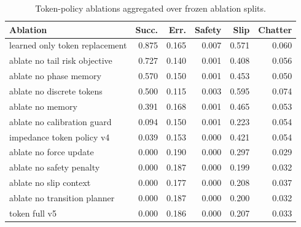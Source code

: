 \begin{table}[t]
\centering
\caption{Token-policy ablations aggregated over frozen ablation splits.}
\label{tab:ablation}
\small
\begin{tabular}{lrrrrr}
\toprule
Ablation & Succ. & Err. & Safety & Slip & Chatter \\
\midrule
learned only token replacement & 0.875 & 0.165 & 0.007 & 0.571 & 0.060 \\
ablate no tail risk objective & 0.727 & 0.140 & 0.001 & 0.408 & 0.056 \\
ablate no phase memory & 0.570 & 0.150 & 0.001 & 0.453 & 0.050 \\
ablate no discrete tokens & 0.500 & 0.115 & 0.003 & 0.595 & 0.074 \\
ablate no memory & 0.391 & 0.168 & 0.001 & 0.465 & 0.053 \\
ablate no calibration guard & 0.094 & 0.150 & 0.001 & 0.223 & 0.054 \\
impedance token policy v4 & 0.039 & 0.153 & 0.000 & 0.421 & 0.054 \\
ablate no force update & 0.000 & 0.190 & 0.000 & 0.297 & 0.029 \\
ablate no safety penalty & 0.000 & 0.187 & 0.000 & 0.199 & 0.032 \\
ablate no slip context & 0.000 & 0.177 & 0.000 & 0.208 & 0.037 \\
ablate no transition planner & 0.000 & 0.187 & 0.000 & 0.200 & 0.032 \\
token full v5 & 0.000 & 0.186 & 0.000 & 0.207 & 0.033 \\
\bottomrule
\end{tabular}
\end{table}
